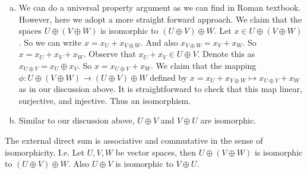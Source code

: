 \begin{problem}
	\begin{solution}
		\begin{enumerate}[(a)]
			\item We can do a universal property argument as we can find in Roman textbook. However, here we adopt a more straight forward approach. We claim that the spaces $ U\oplus(V\oplus W) $ is isomorphic to $ (U\oplus V)\oplus W $. Let $ x\in U\oplus(V\oplus W) $. So we can write $ x = x_U + x_{V\oplus W} $. And also $ x_{V\oplus W} = x_{V} + x_{W} $. So $ x = x_U + x_V + x_W $. Observe that $ x_U + x_V \in U\oplus V $. Denote this as $ x_{U\oplus V} = x_U \oplus x_V $. So $ x = x_{U\oplus V} + x_W  $. We claim that the mapping $ \phi: U\oplus(V\oplus W) \to (U\oplus V)\oplus W $ defined by $ x = x_{U}+x_{V\oplus W} \mapsto x_{U\oplus V} + x_W $ as in our discussion above. It is straightforward to check that this map linear, surjective, and injective. Thus an isomorphism.
			
			\item Similar to our discussion above, $ U\oplus V $ and $ V\oplus U $ are isomorphic.
		\end{enumerate}
		
	\end{solution}
	\begin{theorem}
		The external direct sum is associative and commutative in the sense of isomorphicity. I.e. Let $ U,V,W $ be vector spaces, then $ U\oplus(V\oplus W) $ is isomorphic to $ (U\oplus V)\oplus W $. Also $ U\oplus V $ is isomorphic to $ V\oplus U $.
	\end{theorem}
\end{problem}



